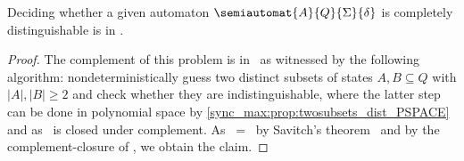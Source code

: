 \begin{theorem}
	\label{sync_max:thm:decision:cd_PSPACE}
	Deciding whether a given automaton $\semiautomat{A}{Q}{\Sigma}{\delta}$ is completely distinguishable is in \PSPACE. 
\end{theorem}
\begin{proof}
	The complement of this problem is in \NPSPACE\ 
	as witnessed by the following algorithm:
	nondeterministically guess two distinct subsets of states $A,B \subseteq Q$
	with $|A|,|B| \ge 2$
	and check whether they are indistinguishable,
	where the latter step can be done in polynomial space
	by \cref{sync_max:prop:twosubsets_dist_PSPACE}
	and as \PSPACE\ is closed under complement.
	As \PSPACE\  = \NPSPACE\ 
	by Savitch's theorem~\cite{DBLP:journals/jcss/Savitch70}
	and by the complement-closure of \PSPACE,
	we obtain the claim.
\end{proof}


